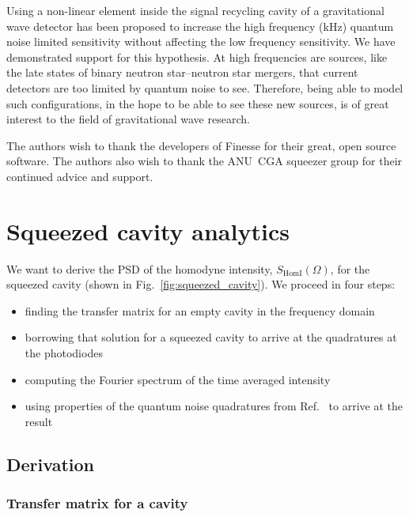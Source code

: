 \documentclass[aps,pra,superscriptaddress,reprint,nofootinbib]{revtex4-1}
\begin{document}
Using a non-linear element inside the signal recycling cavity of a gravitational wave detector has been proposed to increase the high frequency (kHz) quantum noise limited sensitivity without affecting the low frequency sensitivity. We have demonstrated support for this hypothesis. At high frequencies are sources, like the late states of binary neutron star--neutron star mergers, that current detectors are too limited by quantum noise to see. Therefore, being able to model such configurations, in the hope to be able to see these new sources, is of great interest to the field of gravitational wave research.


\begin{acknowledgments}
The authors wish to thank the developers of Finesse for their great, open source software.
The authors also wish to thank the ANU~CGA squeezer group for their continued advice and support.

\end{acknowledgments}


\appendix
\section{Squeezed cavity analytics}
\label{app:squeezed_cavity_analytics}

We want to derive the PSD of the homodyne intensity, $S_{\mathrm{HomI}}(\Omega)$, for the squeezed cavity (shown in Fig.~\ref{fig:squeezed_cavity}). We proceed in four steps:
\begin{itemize}
\item finding the transfer matrix for an empty cavity in the frequency domain
\item borrowing that solution for a squeezed cavity to arrive at the quadratures at the photodiodes
\item computing the Fourier spectrum of the time averaged intensity
\item using properties of the quantum noise quadratures from Ref.~\cite{Danilishin_2012} to arrive at the result
\end{itemize}

\subsection{Derivation}

\subsubsection{Transfer matrix for a cavity}
\end{document}

